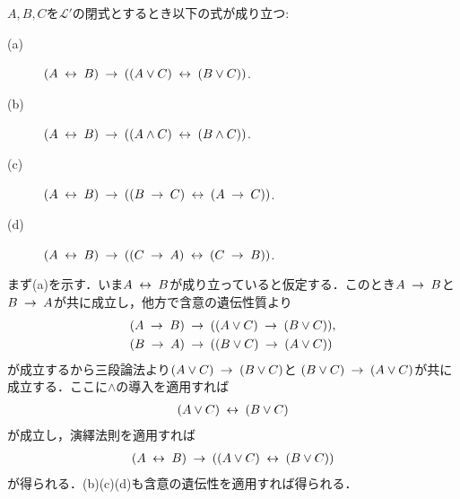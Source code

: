 	\begin{screen}
		\begin{logicalthm}[同値記号の遺伝性質]\label{logicalthm:hereditary_of_equivalence}
			$A,B,C$を$\mathcal{L}'$の閉式とするとき以下の式が成り立つ:
			\begin{description}
				\item[(a)] $(A \lrarrow B) \rarrow ((A \vee C) \lrarrow (B \vee C))$.
				\item[(b)] $(A \lrarrow B) \rarrow ((A \wedge C) \lrarrow (B \wedge C))$.
				\item[(c)] $(A \lrarrow B) \rarrow ((B \rarrow C) \lrarrow (A \rarrow C))$.
				
				\item[(d)] $(A \lrarrow B) \rarrow ((C \rarrow A) \lrarrow (C \rarrow B))$.
			\end{description}
		\end{logicalthm}
	\end{screen}
	
	\begin{prf}
		まず(a)を示す．いま$A \lrarrow B$が成り立っていると仮定する．このとき$A \rarrow B$と
		$B \rarrow A$が共に成立し，他方で含意の遺伝性質より
		\begin{align}
			&(A \rarrow B) \rarrow ((A \vee C) \rarrow (B \vee C)), \\
			&(B \rarrow A) \rarrow ((B \vee C) \rarrow (A \vee C))
		\end{align}
		が成立するから三段論法より$(A \vee C) \rarrow (B \vee C)$と
		$(B \vee C) \rarrow (A \vee C)$が共に成立する．ここに$\wedge$の導入を適用すれば
		\begin{align}
			(A \vee C) \lrarrow (B \vee C)
		\end{align}
		が成立し，演繹法則を適用すれば
		\begin{align}
			(A \lrarrow B) \rarrow ((A \vee C) \lrarrow (B \vee C))
		\end{align}
		が得られる．(b)(c)(d)も含意の遺伝性を適用すれば得られる．
		\QED
	\end{prf}
	
